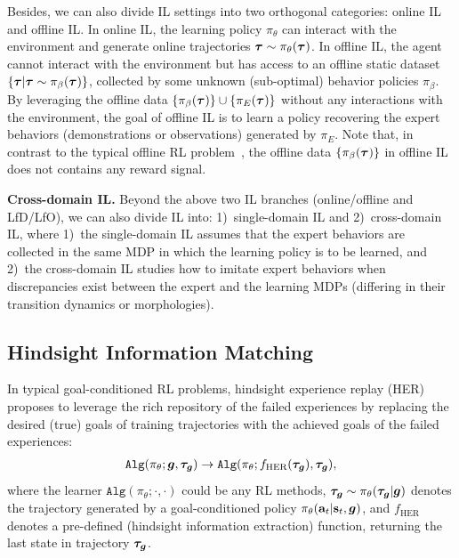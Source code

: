 Besides, we can also divide IL settings into two orthogonal categories: {{online IL}} and {{offline IL}}. 
In {{{online IL}}}, the learning policy $\pi_\theta$ can interact with the environment and generate online trajectories ${\bm{\tau}}\sim\pi_\theta({\bm{\tau}})$. %
In {{{offline IL}}}, the agent cannot interact with the environment but has access to an offline static dataset $\{{\bm{\tau}} |{\bm{\tau}} \sim \pi_\beta({\bm{\tau}})\}$, collected by some unknown (sub-optimal) behavior policies $\pi_\beta$. By leveraging the offline data $\{\pi_\beta({\bm{\tau}})\} \cup \{\pi_E({\bm{\tau}})\}$ without any interactions with the environment, the goal of offline IL is to learn a policy recovering the expert behaviors (demonstrations or observations) generated by $\pi_E$. Note that, in contrast to the typical offline RL problem~\citep{levine2020offline}, the offline data $\{\pi_\beta({\bm{\tau}})\}$ in offline IL does not {contains} any reward signal. 

\textbf{Cross-domain IL.} Beyond the above two IL branches (online/offline and LfD/LfO), we can also divide IL into: 1)~single-domain IL and 2)~cross-domain IL, where 1)~the single-domain IL assumes that the expert behaviors are collected in the same MDP in which the learning policy is to be learned, and 2)~the cross-domain IL studies how to imitate expert behaviors when
discrepancies exist between the expert and the learning MDPs (\eg differing in their transition dynamics or morphologies). 





\subsection{Hindsight Information Matching} 
\label{sec:hindsight-infomation-matching}

In typical goal-conditioned RL problems, hindsight experience replay (HER)~\citep{andrychowicz2017hindsight} proposes to leverage the rich repository of the failed experiences by replacing the desired (true) goals of training trajectories with the achieved goals of the failed experiences:  
\begin{align}
	\texttt{Alg} (\pi_\theta; {\bm{g}}, {\bm{\tau}}_{\bm{g}}) \to \texttt{Alg} (\pi_\theta; {f}_{\text{HER}}({\bm{\tau}}_{\bm{g}}), {\bm{\tau}}_{\bm{g}}), \nonumber
\end{align}
where the learner $\texttt{Alg}(\pi_\theta; \cdot, \cdot)$ could be any RL methods, ${\bm{\tau}}_{\bm{g}}\sim\pi_\theta({\bm{\tau}}_{\bm{g}}|{\bm{g}})$ denotes the trajectory generated by a goal-conditioned policy $\pi_\theta(\mathbf{a}_t|\mathbf{s}_t,{\bm{g}})$, and ${f}_{\text{HER}}$ denotes a pre-defined (hindsight information extraction) function, \eg returning the last state in trajectory ${\bm{\tau}}_{\bm{g}}$. 

